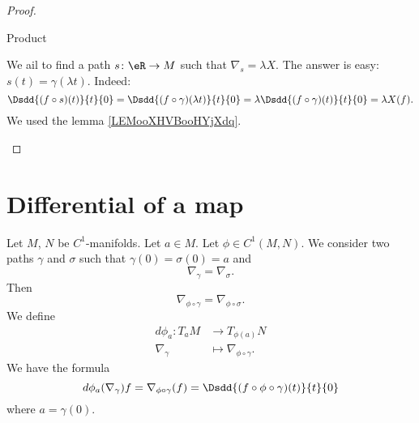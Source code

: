 \begin{proof}
\begin{subproof}
\item[Product]

        We ail to find a path \( s\colon \eR\to M\) such that \( \nabla_s=\lambda X\). The answer is easy: \( s(t)=\gamma(\lambda t)\). Indeed:
        \begin{equation}
            \Dsdd{ (f\circ s)(t) }{t}{0}=\Dsdd{ (f\circ \gamma)(\lambda t) }{t}{0}=\lambda \Dsdd{ (f\circ \gamma)(t) }{t}{0}=\lambda X(f).
        \end{equation}
        We used the lemma \ref{LEMooXHVBooHYjXdq}.
    \end{subproof}
\end{proof}

\section{Differential of a map}

\begin{propositionDef}      \label{DEFooDRGUooDPFIJa}
    Let \( M\), \( N\) be \( C^1\)-manifolds. Let \( a\in M\). Let \( \phi\in C^1(M,N)\). We consider two paths \( \gamma\) and \( \sigma\) such that \( \gamma(0)=\sigma(0)=a\) and
    \begin{equation}
        \nabla_{\gamma}=\nabla_{\sigma}.
    \end{equation}
    Then
    \begin{equation}
        \nabla_{\phi\circ \gamma}=\nabla_{\phi\circ \sigma}.
    \end{equation}
    We define
    \begin{equation}        \label{EQooQNZPooMVaSQC}
        \begin{aligned}
            d\phi_a\colon T_aM&\to T_{\phi(a)}N \\
            \nabla_{\gamma}&\mapsto \nabla_{\phi\circ \gamma}. 
        \end{aligned}
    \end{equation}
    We have the formula
    \begin{equation}
        d\phi_a(\nabla_{\gamma})f=\nabla_{\phi\circ \gamma}(f)=\Dsdd{ (f\circ\phi\circ\gamma)(t) }{t}{0}
    \end{equation}
    where \( a=\gamma(0)\).
\end{propositionDef}

